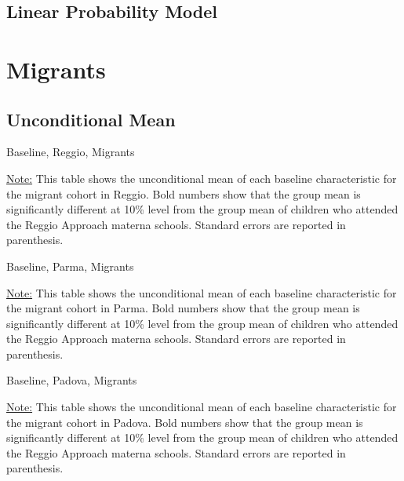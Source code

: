 \documentclass[12pt]{article}
\begin{document}
\subsection{Linear Probability Model}




\section{Migrants}
\subsection{Unconditional Mean}
\begin{table}[H]
\caption{Baseline, Reggio, Migrants} \label{tab:base-reggio-migr}
\scalebox{0.90}{

}
\begin{footnotesize}
\vspace{0.5mm} 

\underline{Note:} This table shows the unconditional mean of each baseline characteristic for the migrant cohort in Reggio. Bold numbers show that the group mean is significantly different at 10\% level from the group mean of children who attended the Reggio Approach materna schools. Standard errors are reported in parenthesis. 
\end{footnotesize}
\end{table}

\begin{table}[H]
\caption{Baseline, Parma, Migrants} \label{tab:base-parma-migr}
\scalebox{0.85}{

}
\begin{footnotesize}
\vspace{0.5mm} 

\underline{Note:} This table shows the unconditional mean of each baseline characteristic for the migrant cohort in Parma. Bold numbers show that the group mean is significantly different at 10\% level from the group mean of children who attended the Reggio Approach materna schools. Standard errors are reported in parenthesis. 
\end{footnotesize}
\end{table}

\begin{table}[H]
\caption{Baseline, Padova, Migrants} \label{tab:base-padova-migr}
\scalebox{0.85}{

}
\begin{footnotesize}
\vspace{0.5mm} 

\underline{Note:} This table shows the unconditional mean of each baseline characteristic for the migrant cohort in Padova. Bold numbers show that the group mean is significantly different at 10\% level from the group mean of children who attended the Reggio Approach materna schools. Standard errors are reported in parenthesis. 
\end{footnotesize}
\end{table}
\end{document}
